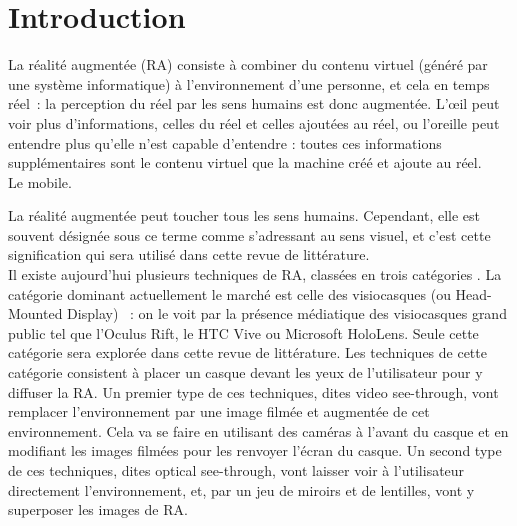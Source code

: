 \section*{Introduction}

La réalité augmentée (RA) consiste à combiner du contenu virtuel (généré par une système informatique) à l'environnement d'une personne, et cela en temps réel~: la perception du réel par les sens humains est donc augmentée. L’œil peut voir plus d'informations, celles du réel et celles ajoutées au réel, ou l'oreille peut entendre plus qu'elle n'est capable d'entendre : toutes ces informations supplémentaires sont le contenu virtuel que la machine créé et ajoute au réel. \\
Le mobile.

La réalité augmentée peut toucher tous les sens humains. Cependant, elle est souvent désignée sous ce terme comme s'adressant au sens visuel, et c'est cette signification qui sera utilisé dans cette revue de littérature. \\
Il existe aujourd'hui plusieurs techniques de RA, classées en trois catégories . La catégorie dominant actuellement le marché est celle des visiocasques (ou \foreignlanguage{english}{Head-Mounted Display}) \cite[]{VanKrevelenPoelman2010}~: on le voit par la présence médiatique des visiocasques grand public tel que l'Oculus Rift, le HTC Vive ou Microsoft HoloLens. Seule cette catégorie sera explorée dans cette revue de littérature. Les techniques de cette catégorie consistent à placer un casque devant les yeux de l'utilisateur pour y diffuser la RA. Un premier type de ces techniques, dites \foreignlanguage{english}{video see-through}, vont remplacer l'environnement par une image filmée et augmentée de cet environnement. Cela va se faire en utilisant des caméras à l'avant du casque et en modifiant les images filmées pour les renvoyer l'écran du casque. Un second type de ces techniques, dites \foreignlanguage{english}{optical see-through}, vont laisser voir à l'utilisateur directement l'environnement, et, par un jeu de miroirs et de lentilles, vont y superposer les images de RA.


